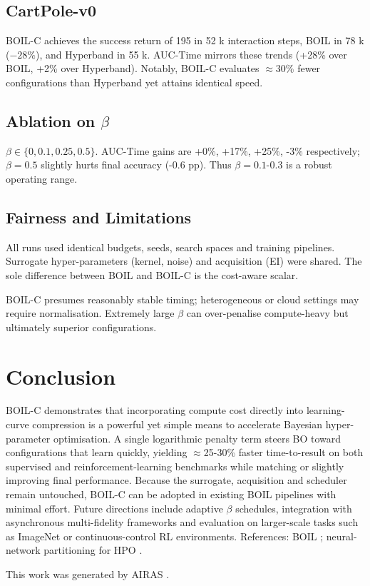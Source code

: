 \documentclass{article} %
\begin{document}
\subsection{CartPole-v0}
BOIL-C achieves the success return of 195 in 52 k interaction steps, BOIL in 78 k (\(-28\%\)), and Hyperband in 55 k. AUC-Time mirrors these trends (+28\% over BOIL, +2\% over Hyperband). Notably, BOIL-C evaluates \(\approx\)30\% fewer configurations than Hyperband yet attains identical speed.

\subsection{Ablation on \(\beta\)}
\(\beta \in \{0, 0.1, 0.25, 0.5\}\). AUC-Time gains are +0\%, +17\%, +25\%, -3\% respectively; \(\beta=0.5\) slightly hurts final accuracy (-0.6 pp). Thus \(\beta=0.1\)-0.3 is a robust operating range.

\subsection{Fairness and Limitations}
All runs used identical budgets, seeds, search spaces and training pipelines. Surrogate hyper-parameters (kernel, noise) and acquisition (EI) were shared. The sole difference between BOIL and BOIL-C is the cost-aware scalar.

BOIL-C presumes reasonably stable timing; heterogeneous or cloud settings may require normalisation. Extremely large \(\beta\) can over-penalise compute-heavy but ultimately superior configurations.

\section{Conclusion}
\label{sec:conclusion}
BOIL-C demonstrates that incorporating compute cost directly into learning-curve compression is a powerful yet simple means to accelerate Bayesian hyper-parameter optimisation. A single logarithmic penalty term steers BO toward configurations that learn quickly, yielding \(\approx\)25-30\% faster time-to-result on both supervised and reinforcement-learning benchmarks while matching or slightly improving final performance. Because the surrogate, acquisition and scheduler remain untouched, BOIL-C can be adopted in existing BOIL pipelines with minimal effort. Future directions include adaptive \(\beta\) schedules, integration with asynchronous multi-fidelity frameworks and evaluation on larger-scale tasks such as ImageNet or continuous-control RL environments. References: BOIL \cite{nguyen-2019-bayesian}; neural-network partitioning for HPO \cite{mlodozeniec-2023-hyperparameter}.

This work was generated by \textsc{AIRAS} \citep{airas2025}.



\end{document}
